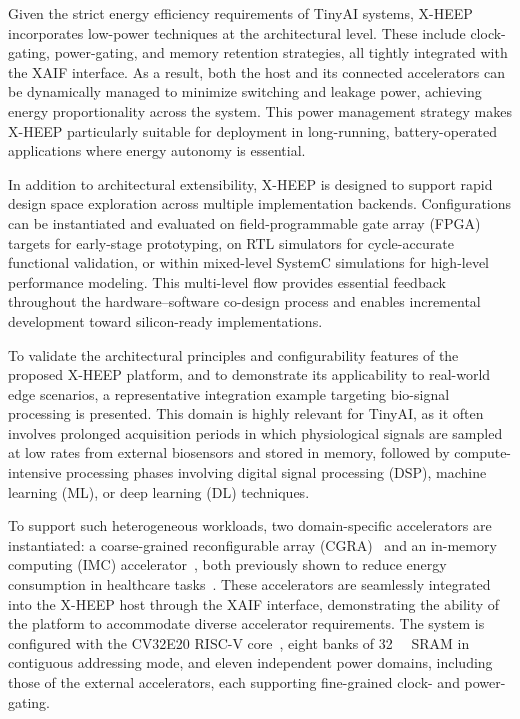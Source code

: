         Given the strict energy efficiency requirements of TinyAI systems, \mbox{X-HEEP} incorporates low-power techniques at the architectural level. These include clock-gating, power-gating, and memory retention strategies, all tightly integrated with the XAIF interface. As a result, both the host and its connected accelerators can be dynamically managed to minimize switching and leakage power, achieving energy proportionality across the system. This power management strategy makes \mbox{X-HEEP} particularly suitable for deployment in long-running, battery-operated applications where energy autonomy is essential.
        
        In addition to architectural extensibility, \mbox{X-HEEP} is designed to support rapid design space exploration across multiple implementation backends. Configurations can be instantiated and evaluated on field-programmable gate array (FPGA) targets for early-stage prototyping, on RTL simulators for cycle-accurate functional validation, or within mixed-level SystemC simulations for high-level performance modeling. This multi-level flow provides essential feedback throughout the hardware–software co-design process and enables incremental development toward silicon-ready implementations.
        
        To validate the architectural principles and configurability features of the proposed \mbox{X-HEEP} platform, and to demonstrate its applicability to real-world edge scenarios, a representative integration example targeting bio-signal processing is presented. This domain is highly relevant for TinyAI, as it often involves prolonged acquisition periods in which physiological signals are sampled at low rates from external biosensors and stored in memory, followed by compute-intensive processing phases involving digital signal processing (DSP), machine learning (ML), or deep learning (DL) techniques.
        
        To support such heterogeneous workloads, two domain-specific accelerators are instantiated: a coarse-grained reconfigurable array (CGRA)~\cite{oe-cgra} and an in-memory computing (IMC) accelerator~\cite{blade}, both previously shown to reduce energy consumption in healthcare tasks~\cite{bio_apps, co-design_vision}. These accelerators are seamlessly integrated into the \mbox{X-HEEP} host through the XAIF interface, demonstrating the ability of the platform to accommodate diverse accelerator requirements. The system is configured with the CV32E20 RISC-V core~\cite{zeroriscy}, eight banks of \SI{32}{\kibi\byte} SRAM in contiguous addressing mode, and eleven independent power domains, including those of the external accelerators, each supporting fine-grained clock- and power-gating.
        
